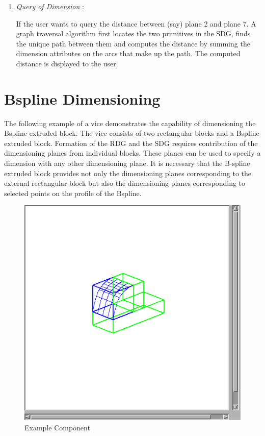 \begin{enumerate}
		\item

    				{\em Query of Dimension} :

    				If the user wants to query the distance between (say) 
					plane 2 and
					plane 7. A graph traversal algorithm first locates the 
					two primitives in the SDG, finds the unique path between 
					them and computes the distance by summing the dimension 
					attributes on the arcs that make up the path. 
					The computed distance is displayed to the user.

		\end{enumerate}

	\section{Bspline Dimensioning}

	The following example of a vice demonstrates the capability of 
	dimensioning the Bspline extruded block. The vice consists of two 
	rectangular blocks and a Bspline extruded block.
    Formation of the RDG and the SDG requires contribution of the dimensioning
    planes from individual blocks. These planes can be used to specify a
    dimension with any other dimensioning plane. It is necessary that the
    B-spline extruded block provides not only the dimensioning planes 
	corresponding to the
    external rectangular block but also the dimensioning planes corresponding
    to selected points on the profile of the Bspline.
    
           \begin{figure}[htbp]
            \hspace{4cm}
            \includegraphics[scale=2]{EX2COMP.png}
            \caption{Example Component}
            \label{ex2comp}
        \end{figure}
        
